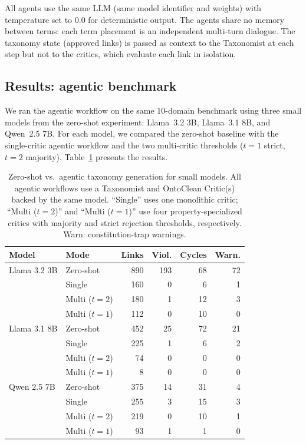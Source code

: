 \documentclass{IOS-Book-Article}
\begin{document}
All agents use the same LLM (same model identifier and weights) with
temperature set to 0.0 for deterministic output.  The agents share no
memory between terms: each term placement is an independent
multi-turn dialogue.  The taxonomy state (approved links) is passed as
context to the Taxonomist at each step but not to the critics, which
evaluate each link in isolation.

\subsection{Results: agentic benchmark}

We ran the agentic workflow on the same 10-domain benchmark using three
small models from the zero-shot experiment: Llama~3.2 3B, Llama~3.1
8B, and Qwen~2.5 7B.  For each model, we compared the zero-shot
baseline with the single-critic agentic workflow and the two
multi-critic thresholds ($t{=}1$ strict, $t{=}2$ majority).
Table~\ref{tab:agentic} presents the results.

\begin{table}[t]
  \caption{Zero-shot vs.\ agentic taxonomy generation for small models.
    All agentic workflows use a Taxonomist and OntoClean Critic(s)
    backed by the same model.  ``Single'' uses one monolithic critic;
    ``Multi ($t{=}2$)'' and ``Multi ($t{=}1$)'' use four
    property-specialized critics with majority and strict rejection
    thresholds, respectively.  Warn: constitution-trap warnings.}
  \label{tab:agentic}
  \centering
  \begin{tabular}{llrrrr}
    \toprule
    Model        & Mode              & Links & Viol. & Cycles & Warn. \\
    \midrule
    Llama 3.2 3B & Zero-shot         & 890   & 193   & 68     & 72    \\
                 & Single            & 160   & 0     & 6      & 1     \\
                 & Multi ($t{=}2$)   & 180   & 1     & 12     & 3     \\
                 & Multi ($t{=}1$)   & 112   & 0     & 10     & 0     \\
    \midrule
    Llama 3.1 8B & Zero-shot         & 452   & 25    & 72     & 21    \\
                 & Single            & 225   & 1     & 6      & 2     \\
                 & Multi ($t{=}2$)   & 74    & 0     & 0      & 0     \\
                 & Multi ($t{=}1$)   & 8     & 0     & 0      & 0     \\
    \midrule
    Qwen 2.5 7B  & Zero-shot         & 375   & 14    & 31     & 4     \\
                 & Single            & 255   & 3     & 15     & 3     \\
                 & Multi ($t{=}2$)   & 219   & 0     & 10     & 1     \\
                 & Multi ($t{=}1$)   & 93    & 1     & 1      & 0     \\
    \bottomrule
  \end{tabular}
\end{table}
\end{document}

